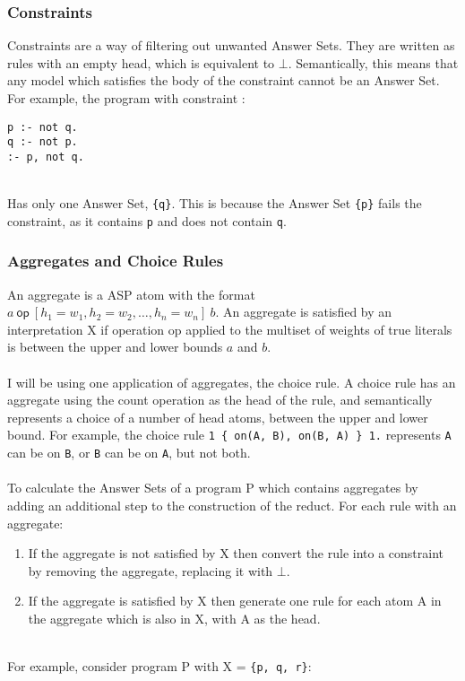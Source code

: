 \subsubsection{Constraints}

Constraints are a way of filtering out unwanted Answer Sets. They are written as rules with an empty head, which is equivalent to $\bot$. Semantically, this means that any model which satisfies the body of the constraint cannot be an Answer Set. For example, the program with constraint : \\

\begin{lstlisting}
p :- not q.
q :- not p.
:- p, not q.
\end{lstlisting}
\mbox{}\\
Has only one Answer Set, \lstinline!{q}!. This is because the Answer Set \lstinline!{p}! fails the constraint, as it contains \lstinline!p! and does not contain \lstinline!q!.

\subsubsection{Aggregates and Choice Rules}

An aggregate is a ASP atom with the format $a \: \textsf{op} \: [h_1=w_1, h_2=w_2, \dots, h_n=w_n 	] \: b$. An aggregate is satisfied by an interpretation X if operation op applied to the multiset of weights of true literals is between the upper and lower bounds $a$ and $b$. \\ \\
I will be using one application of aggregates, the choice rule. A choice rule has an aggregate using the count operation as the head of the rule, and semantically represents a choice of a number of head atoms, between the upper and lower bound. For example, the choice rule \lstinline!1 { on(A, B), on(B, A) } 1.! represents \lstinline!A! can be on \lstinline!B!, or \lstinline!B! can be on \lstinline!A!, but not both. \\ \\
To calculate the Answer Sets of a program P which contains aggregates by adding an additional step to the construction of the reduct. For each rule with an aggregate:

\begin{enumerate}
\item If the aggregate is not satisfied by X then convert the rule into a constraint by removing the aggregate, replacing it with $\bot$.
\item If the aggregate is satisfied by X then generate one rule for each atom A in the aggregate which is also in X, with A as the head.
\end{enumerate}
\mbox{}\\
For example, consider program P with X = \lstinline!{p, q, r}!:\\

